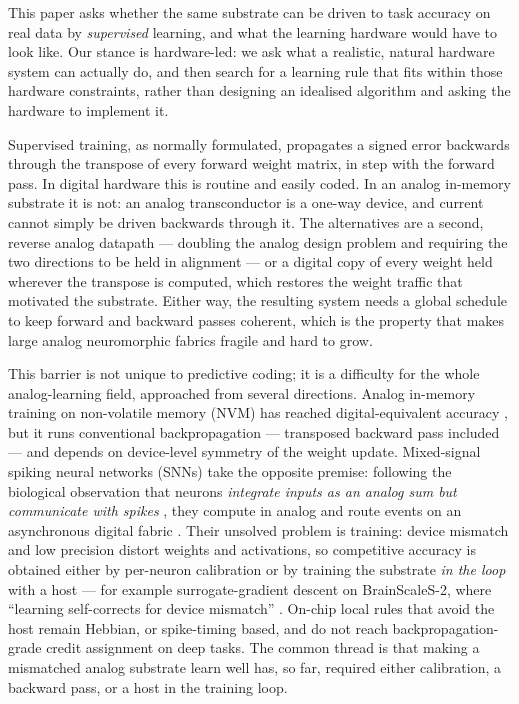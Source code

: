 \documentclass[11pt]{article}
\begin{document}
This paper asks whether the same substrate can be driven to task
accuracy on real data by \emph{supervised} learning, and what the
learning hardware would have to look like. Our stance is hardware-led:
we ask what a realistic, natural hardware system can actually do, and
then search for a learning rule that fits within those hardware
constraints, rather than designing an idealised algorithm and asking the
hardware to implement it.

Supervised training, as normally formulated, propagates a signed error
backwards through the transpose of every forward weight matrix, in step
with the forward pass. In digital hardware this is routine and easily
coded. In an analog in-memory substrate it is not: an analog
transconductor is a one-way device, and current cannot simply be driven
backwards through it. The alternatives are a second, reverse analog
datapath --- doubling the analog design problem and requiring the two
directions to be held in alignment --- or a digital copy of every weight
held wherever the transpose is computed, which restores the weight
traffic that motivated the substrate. Either way, the resulting system
needs a global schedule to keep forward and backward passes coherent,
which is the property that makes large analog neuromorphic fabrics
fragile and hard to grow.

This barrier is not unique to predictive coding; it is a difficulty for
the whole analog-learning field, approached from several directions.
Analog in-memory training on non-volatile memory (NVM) has reached
digital-equivalent accuracy \cite{ambrogio2018equivalent}, but it runs
conventional backpropagation --- transposed backward pass included ---
and depends on device-level symmetry of the weight update. Mixed-signal
spiking neural networks (SNNs) take the opposite premise: following the
biological observation that neurons \emph{integrate inputs as an analog
sum but communicate with spikes} \cite{cramer2022surrogate}, they
compute in analog and route events on an asynchronous digital fabric
\cite{chicca2014neuromorphic, benjamin2014neurogrid, moradi2018dynap}.
Their unsolved problem is training: device mismatch and low precision
distort weights and activations, so competitive accuracy is obtained
either by per-neuron calibration or by training the substrate \emph{in
the loop} with a host --- for example surrogate-gradient descent on
BrainScaleS-2, where ``learning self-corrects for device mismatch''
\cite{cramer2022surrogate}. On-chip local rules that avoid the host
\cite{rubino2023neuromorphic, davies2018loihi} remain Hebbian, or
spike-timing based, and do not reach backpropagation-grade credit
assignment on deep tasks. The common thread is that making a mismatched
analog substrate learn well has, so far, required either calibration, a
backward pass, or a host in the training loop.
\end{document}
